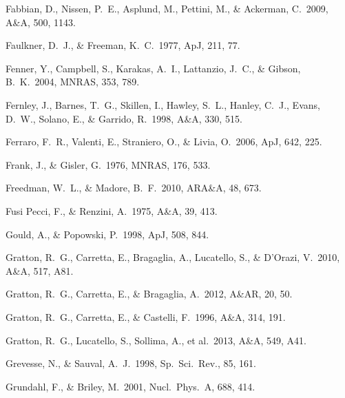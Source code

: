 \documentclass[12pt,preprint]{aastex}
\begin{document}
\begin{thebibliography}{}
Fabbian, D., Nissen, P.~E., Asplund, M., Pettini, M., \& Ackerman, C.~2009,
 A\&A, 500, 1143. 

Faulkner, D.~J., \& Freeman, K.~C.~1977, ApJ, 211, 77.

Fenner, Y., Campbell, S., Karakas, A.~I., Lattanzio, J.~C., \& Gibson,
 B.~K.~2004, MNRAS, 353, 789.

Fernley, J., Barnes, T.~G., Skillen, I., Hawley, S.~L., Hanley, C.~J., Evans,
 D.~W., Solano, E., \& Garrido, R.~1998, A\&A, 330, 515.

Ferraro, F.~R., Valenti, E., Straniero, O., \& Livia, O.~2006, ApJ, 642, 225.

Frank, J., \& Gisler, G.~1976, MNRAS, 176, 533.

Freedman, W.~L., \& Madore, B.~F.~2010, ARA\&A, 48, 673.

Fusi Pecci, F., \& Renzini, A.~1975, A\&A, 39, 413.

Gould, A., \& Popowski, P.~1998, ApJ, 508, 844.


Gratton, R.~G., Carretta, E., Bragaglia, A., Lucatello, S., \& D'Orazi,
 V.~2010, A\&A, 517, A81.

Gratton, R.~G., Carretta, E., \& Bragaglia, A.~2012, A\&AR, 20, 50.

Gratton, R.~G., Carretta, E., \& Castelli, F.~1996, A\&A, 314, 191.

Gratton, R.~G., Lucatello, S., Sollima, A., et al.~2013, A\&A, 549, A41.

Grevesse, N., \& Sauval, A.~J.~1998, Sp.~Sci.~Rev., 85, 161.


Grundahl, F., \& Briley, M.~2001, Nucl.~Phys.~A, 688, 414.


\end{thebibliography}
\end{document}

